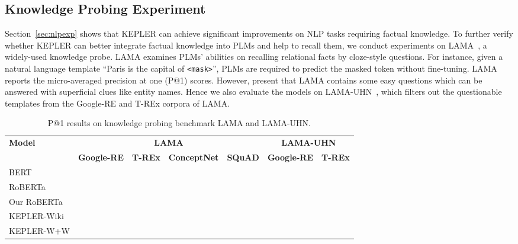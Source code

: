 \subsection{Knowledge Probing Experiment}

Section~\ref{sec:nlpexp} shows that KEPLER can achieve significant improvements on NLP tasks requiring factual knowledge. To further verify whether KEPLER can better integrate factual knowledge into PLMs and help to recall them, we conduct experiments on LAMA~\citep{petroni2019language}, a widely-used knowledge probe. LAMA examines PLMs' abilities on recalling relational facts by cloze-style questions. For instance, given a natural language template ``Paris is the capital of \texttt{<mask>}'', PLMs are required to predict the masked token without fine-tuning. 
LAMA reports the micro-averaged precision at one (P@1) scores. However, \citet{Poerner2019EBERT} present that LAMA contains some easy questions which can be answered with superficial clues like entity names. Hence we also evaluate the models on LAMA-UHN~\citep{Poerner2019EBERT}, which filters out the questionable templates from the Google-RE and T-REx corpora of LAMA.





\begin{table*}[t]
\centering
\begin{adjustbox}{max width=0.98\linewidth}
\begin{tabular}{l|cccc|cc}
\toprule
\multirow{2}{*}{\textbf{Model}} & \multicolumn{4}{c|}{\textbf{LAMA}}                                         & \multicolumn{2}{c}{\textbf{LAMA-UHN}} \\ \cmidrule{2-7} 
                                & \textbf{Google-RE} & \textbf{T-REx} & \textbf{ConceptNet} & \textbf{SQuAD} & \textbf{Google-RE}  & \textbf{T-REx}  \\ \midrule
BERT                       &               &          &               &          &           &               \\
RoBERTa                         &               &          &               &           &                &           \\ \midrule
Our RoBERTa                     &               &          &               &           &                &           \\
KEPLER-Wiki                     &               &          &               &          &                &           \\
KEPLER-W+W                      &               &          &               &          &                &           \\ \bottomrule
\end{tabular}
\end{adjustbox}
	\caption{P@1 results on knowledge probing benchmark LAMA and LAMA-UHN.}
	\label{tab:lama}
\end{table*}



